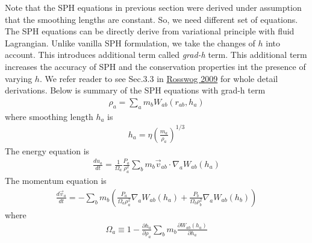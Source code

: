 \documentclass[notes.tex]{subfiles}
\begin{document}
Note that the SPH equations in previous section were derived under 
assumption that the smoothing lengths are constant. So, we need 
different set of equations. The SPH equations can be directly derive
from variational principle with fluid Lagrangian. Unlike vanilla SPH formulation,
we take the changes of $h$ into account. This introduces additional term
called {\it grad-h} term. This additional term increases the accuracy of SPH
and the conservation properties int the presence of varying $h$.
We refer reader to see Sec.3.3 in \href{https://arxiv.org/pdf/0903.5075.pdf}{Rosswog 2009} for whole detail derivations. 
Below is summary of the SPH equations with grad-h term
\begin{align}
\label{eqn:grad-h:density}
\rho_a = \sum_a m_b W_{ab}(r_{ab},h_a)
\end{align}
where smoothing length $h_a$ is
\begin{align}
\label{eqn:grad-h:smoothing}
h_a = \eta \left(\frac{m_a}{\rho_a} \right)^{1/3}
\end{align}
The energy equation is
\begin{align}
\label{eqn:grad-h:ener}
\frac{du_a}{dt} = \frac{1}{\Omega_a} \frac{P_a}{\rho_a^2} \sum_b m_b \vec{v}_{ab} \cdot \nabla_a W_{ab}(h_a)
\end{align}
The momentum equation is
\begin{align}
\label{eqn:grad-h:mom}
\frac{d \vec{v}_a}{dt} = - \sum_b m_b \left(\frac{P_a}{\Omega_a \rho_a^2} \nabla_a W_{ab}(h_a) + \frac{P_b}{\Omega_b \rho_b^2} \nabla_a W_{ab}(h_b) \right)
\end{align}
where
\begin{align}
\Omega_a \equiv 1 - \frac{\partial h_a}{\partial \rho_a} \sum_b m_b \frac{\partial W_{ab}(h_a)}{\partial h_a} 
\end{align}
\end{document}
